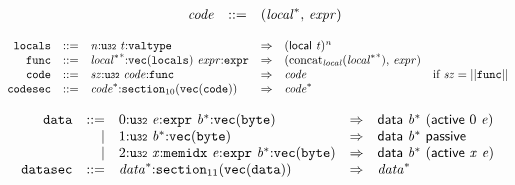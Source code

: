 \vspace{1ex}

$$
\begin{array}{@{}lrrl@{}l@{}}
& {\mathit{code}} &::=& ({{\mathit{local}}^\ast},\, {\mathit{expr}}) \\
\end{array}
$$

$$
\begin{array}{@{}l@{}rrlll@{}l@{}}
& {\mathtt{locals}} &::=& {\mathit{n}}{:}{\mathtt{u{\scriptstyle32}}}~{\mathit{t}}{:}{\mathtt{valtype}} &\Rightarrow& {(\mathsf{local}~{\mathit{t}})^{{\mathit{n}}}} \\
& {\mathtt{func}} &::=& {{{\mathit{local}}^\ast}^\ast}{:}{\mathtt{vec}}({\mathtt{locals}})~{\mathit{expr}}{:}{\mathtt{expr}} &\Rightarrow& ({{\mathrm{concat}}}_{{\mathit{local}}}({{{\mathit{local}}^\ast}^\ast}),\, {\mathit{expr}}) \\
& {\mathtt{code}} &::=& {\mathit{sz}}{:}{\mathtt{u{\scriptstyle32}}}~{\mathit{code}}{:}{\mathtt{func}} &\Rightarrow& {\mathit{code}} &\quad
  \mbox{if}~{\mathit{sz}} = ||{\mathtt{func}}|| \\
& {\mathtt{codesec}} &::=& {{\mathit{code}}^\ast}{:}{{\mathtt{section}}}_{10}({\mathtt{vec}}({\mathtt{code}})) &\Rightarrow& {{\mathit{code}}^\ast} \\
\end{array}
$$

\vspace{1ex}

$$
\begin{array}{@{}l@{}rrlll@{}l@{}}
& {\mathtt{data}} &::=& 0{:}{\mathtt{u{\scriptstyle32}}}~{\mathit{e}}{:}{\mathtt{expr}}~{{\mathit{b}}^\ast}{:}{\mathtt{vec}}({\mathtt{byte}}) &\Rightarrow& \mathsf{data}~{{\mathit{b}}^\ast}~(\mathsf{active}~0~{\mathit{e}}) \\ &&|&
1{:}{\mathtt{u{\scriptstyle32}}}~{{\mathit{b}}^\ast}{:}{\mathtt{vec}}({\mathtt{byte}}) &\Rightarrow& \mathsf{data}~{{\mathit{b}}^\ast}~\mathsf{passive} \\ &&|&
2{:}{\mathtt{u{\scriptstyle32}}}~{\mathit{x}}{:}{\mathtt{memidx}}~{\mathit{e}}{:}{\mathtt{expr}}~{{\mathit{b}}^\ast}{:}{\mathtt{vec}}({\mathtt{byte}}) &\Rightarrow& \mathsf{data}~{{\mathit{b}}^\ast}~(\mathsf{active}~{\mathit{x}}~{\mathit{e}}) \\
& {\mathtt{datasec}} &::=& {{\mathit{data}}^\ast}{:}{{\mathtt{section}}}_{11}({\mathtt{vec}}({\mathtt{data}})) &\Rightarrow& {{\mathit{data}}^\ast} \\
\end{array}
$$


